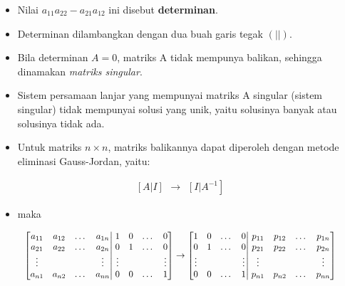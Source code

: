 \documentclass[pdflatex,compress,mathserif]{beamer}
\newcommand*{\Scale}[2][4]{\scalebox{#1}{$#2$}}%
\begin{document}
\begin{frame}
	\begin{itemize}
		\item Nilai $ a_{11} a_{22} - a_{21}a_{12} $ ini disebut \textbf{determinan}.
		\item Determinan dilambangkan dengan dua buah garis tegak $ (| |) $.
		\item Bila determinan $ A = 0 $, matriks A tidak mempunya balikan, sehingga dinamakan \textit{matriks singular}.
		\item Sistem persamaan lanjar yang mempunyai matriks A singular (sistem singular) tidak mempunyai solusi yang unik, yaitu solusinya banyak atau solusinya tidak ada.
	\end{itemize}
\end{frame}

\begin{frame}
	\begin{itemize}
		\item Untuk matriks $ n \times n $, matriks balikannya dapat diperoleh dengan metode eliminasi Gauss-Jordan, yaitu:
	\end{itemize}
	\[
		\begin{matrix}
			\left[ A \right|
			\left. I \right]
		\end{matrix}
		\rightarrow
		\begin{matrix}
			\left[ I \right|
			\left. A^{-1} \right]
		\end{matrix}
	\]
	\begin{itemize}
		\item[] maka
	\end{itemize}
	\[\Scale[0.9]{
		\left[
			\begin{matrix}
				a_{11} & a_{12} & \dots & a_{1n} \\
				a_{21} & a_{22} & \dots & a_{2n} \\
				\vdots &  &  & \vdots \\
				a_{n1} & a_{n2} & \dots & a_{nn}
			\end{matrix}
		\right|
		\left.
			\begin{matrix}
			1 & 0 & \dots & 0 \\
			0 & 1 & \dots & 0 \\
			\vdots &  &  & \vdots \\
			0 & 0 & \dots & 1
			\end{matrix}
		\right]
		\rightarrow
		\left[
		\begin{matrix}
			1 & 0 & \dots & 0 \\
			0 & 1 & \dots & 0 \\
			\vdots &  &  & \vdots \\
			0 & 0 & \dots & 1
		\end{matrix}
		\right|
		\left.
		\begin{matrix}
			p_{11} & p_{12} & \dots & p_{1n} \\
			p_{21} & p_{22} & \dots & p_{2n} \\
			\vdots &  &  & \vdots \\
			p_{n1} & p_{n2} & \dots & p_{nn}
		\end{matrix}
		\right]
	}\]
\end{frame}
\end{document}
